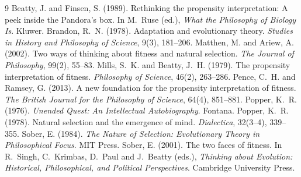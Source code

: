\documentclass{situationist-preprint}
\begin{document}
\begin{thebibliography}{9}\small
{} Beatty, J. and Finsen, S. (1989). Rethinking the propensity interpretation: A peek inside the Pandora's box. In M.~Ruse (ed.), \emph{What the Philosophy of Biology Is}. Kluwer.
 Brandon, R.~N. (1978). Adaptation and evolutionary theory. \emph{Studies in History and Philosophy of Science}, 9(3), 181--206.
 Matthen, M. and Ariew, A. (2002). Two ways of thinking about fitness and natural selection. \emph{The Journal of Philosophy}, 99(2), 55--83.
 Mills, S.~K. and Beatty, J.~H. (1979). The propensity interpretation of fitness. \emph{Philosophy of Science}, 46(2), 263--286.
 Pence, C.~H. and Ramsey, G. (2013). A new foundation for the propensity interpretation of fitness. \emph{The British Journal for the Philosophy of Science}, 64(4), 851--881.
 Popper, K.~R. (1976). \emph{Unended Quest: An Intellectual Autobiography}. Fontana.
 Popper, K.~R. (1978). Natural selection and the emergence of mind. \emph{Dialectica}, 32(3--4), 339--355.
 Sober, E. (1984). \emph{The Nature of Selection: Evolutionary Theory in Philosophical Focus}. MIT Press.
 Sober, E. (2001). The two faces of fitness. In R.~Singh, C.~Krimbas, D.~Paul and J.~Beatty (eds.), \emph{Thinking about Evolution: Historical, Philosophical, and Political Perspectives}. Cambridge University Press.
\end{thebibliography}
\end{document}
